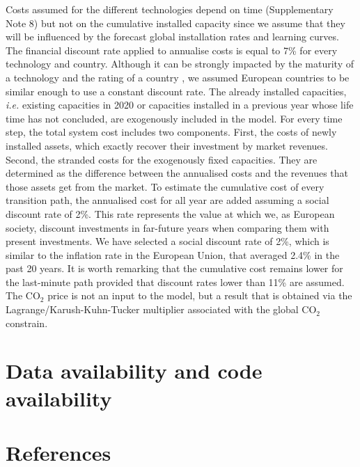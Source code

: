 \documentclass[5p]{elsarticle} %
\begin{document}
Costs assumed for the different technologies depend on time (Supplementary Note 8) but not on the cumulative installed capacity since we assume that they will be influenced by the forecast global installation rates and learning curves. The financial discount rate applied to annualise costs is equal to 7\% for every technology and country. Although it can be strongly impacted by the maturity of a technology and the rating of a country \cite{Egli_2019}, we assumed European countries to be similar enough to use a constant discount rate. The already installed capacities, \textit{i.e.} existing capacities in 2020 or capacities installed in a previous year whose life time has not concluded, are exogenously included in the model. For every time step, the total system cost includes two components. First, the costs of newly installed assets, which exactly recover their investment by market revenues. Second, the stranded costs for the exogenously fixed capacities. They are determined as the difference between the annualised costs and the revenues that those assets get from the market.  To estimate the cumulative cost of every transition path, the annualised cost for all year are added assuming a social discount rate of 2\%. This rate represents the value at which we, as European society, discount investments in far-future years when comparing them with present investments. We have selected a social discount rate of 2\%, which is similar to the inflation rate in the European Union, that averaged 2.4\% in the past 20 years. It is worth remarking that the cumulative cost remains lower for the last-minute path provided that discount rates lower than 11\% are assumed. The CO$_2$ price is not an input to the model, but a result that is obtained via the Lagrange/Karush-Kuhn-Tucker multiplier associated with the global CO$_2$ constrain. 

\section{Data availability and code availability}

\section{References}

\end{document}

